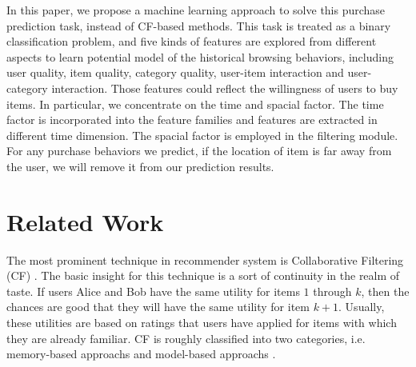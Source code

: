 \documentclass{llncs}
\begin{document}

In this paper, we propose a machine learning approach to solve
this purchase prediction task, instead of CF-based methods.
This task is treated as a binary classification problem,
and five kinds of features are explored from different aspects
to learn potential model of the historical browsing behaviors,
including user quality, item quality, category quality,
user-item interaction and user-category interaction.
Those features could reflect the willingness of users to buy items.
In particular, we concentrate on the time and spacial factor.
The time factor is incorporated into the feature families
and features are extracted in different time dimension.
The spacial factor is employed in the filtering module.
For any purchase behaviors we predict, if the location of item
is far away from the user, we will remove it from our prediction results.



\section{Related Work}
The most prominent technique in recommender system is
Collaborative Filtering (CF) \cite{su2009survey}.
The basic insight for this technique is a sort of continuity in the realm of taste.
If users Alice and Bob have the same utility for items $1$ through $k$,
then the chances are good that they will have the same utility for item $k + 1$.
Usually, these utilities are based on ratings that users have applied for items
with which they are already familiar.
CF is roughly classified into two categories,
i.e. memory-based approachs \cite{linden2003amazon}\cite{wang2006unifying}
and model-based approachs \cite{adomavicius2005toward}\cite{koren2009matrix}.
\end{document}
